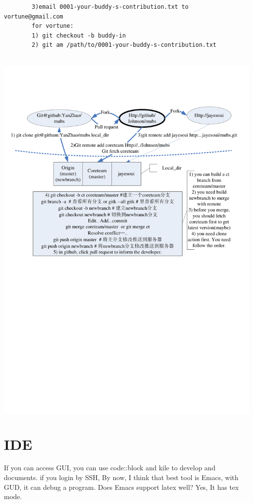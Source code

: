 \documentclass[a4paper,12pt,twoside]{book}
\begin{document}
\begin{itemize}
\begin{itemize}
\begin{verbatim}
		3)email 0001-your-buddy-s-contribution.txt to vortune@gmail.com
		for vortune:
		1) git checkout -b buddy-in
		2) git am /path/to/0001-your-buddy-s-contribution.txt
		
		\end{verbatim}
	\end{itemize}

    \includegraphics[scale=0.7]{pics/Visio-git_cooperate}



\section{IDE}
If you can access GUI, you can use code::block and kile to develop and documents. if
you login by SSH, By now, I think that best tool is Emacs, with GUD, it can debug a
program. Does Emacs support latex well? Yes, It has tex mode. \par


\end{itemize}
\end{document}
